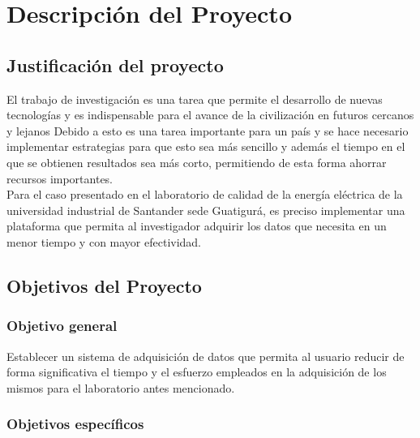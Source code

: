 
\chapter{Descripción del Proyecto}

\section{Justificación del proyecto}

El trabajo de investigación es una tarea que permite el desarrollo de nuevas tecnologías y es indispensable para el avance de la civilización en futuros cercanos y lejanos \cite{Noguera2016}  %
Debido a esto es una tarea importante para un país y se hace necesario implementar estrategias para que esto sea más sencillo y además el tiempo en el que se obtienen resultados sea más corto, permitiendo de esta forma ahorrar recursos importantes. \\  

Para el caso presentado en el laboratorio de calidad de la energía eléctrica de la universidad industrial de Santander sede Guatigurá, es preciso implementar una plataforma que permita al investigador adquirir los datos que necesita en un menor tiempo y con mayor efectividad.  


\section{Objetivos del Proyecto}

\subsection{Objetivo general}

Establecer un sistema de adquisición de datos que permita al usuario reducir de forma significativa el tiempo y el esfuerzo empleados en la adquisición de los mismos para el laboratorio antes mencionado. 

\subsection{Objetivos específicos}

